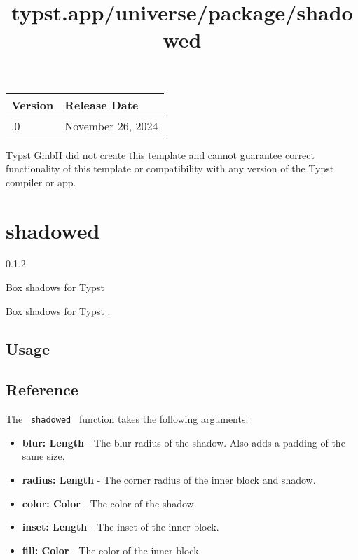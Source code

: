 \begin{longtable}[]{@{}ll@{}}
\toprule\noalign{}
Version & Release Date \\
\midrule\noalign{}
\endhead
\bottomrule\noalign{}
\endlastfoot
1.0.0 & November 26, 2024 \\
\end{longtable}

Typst GmbH did not create this template and cannot guarantee correct
functionality of this template or compatibility with any version of the
Typst compiler or app.


\title{typst.app/universe/package/shadowed}

\label{banner}
\section{shadowed}\label{shadowed}

{ 0.1.2 }

Box shadows for Typst

\label{readme}
Box shadows for \href{https://typst.app/}{Typst} .

\subsection{Usage}\label{usage}

\begin{Shaded}
\begin{Highlighting}[]


\NormalTok{\#shadowed(radius: 4pt, inset: 12pt)[}
\NormalTok{]}
\end{Highlighting}
\end{Shaded}


\subsection{Reference}\label{reference}

The \texttt{\ shadowed\ } function takes the following arguments:

\begin{itemize}
\tightlist
\item
  \textbf{blur: Length} - The blur radius of the shadow. Also adds a
  padding of the same size.
\item
  \textbf{radius: Length} - The corner radius of the inner block and
  shadow.
\item
  \textbf{color: Color} - The color of the shadow.
\item
  \textbf{inset: Length} - The inset of the inner block.
\item
  \textbf{fill: Color} - The color of the inner block.
\end{itemize}


